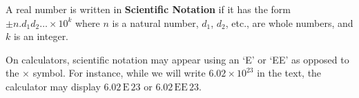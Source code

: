 \medskip

\colorbox{ResultColor}{\bbm

\begin{defn} \label{scientificnotation}

A real number is written in \textbf{Scientific Notation} if it has the form $\pm n . d_{1} d_{2} \ldots \times 10^{k}$ where $n$ is a natural number, $d_{1}$, $d_{2}$, etc., are whole numbers, and $k$ is an integer.

\end{defn}

\ebm}

\medskip

On calculators, scientific notation may appear using an `E' or `EE' as opposed to the $\times$ symbol.  For instance, while we will write $6.02 \times 10^{23}$ in the text, the calculator may display $6.02\, \text{E} \, 23$ or $6.02\, \text{EE} \, 23$. 


